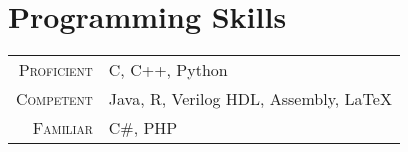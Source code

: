 
\section{Programming Skills}

\begin{tabular}{r|p{15.8cm}}
\textsc{Proficient} & C, C++, Python\\
\textsc{Competent} & Java, R, Verilog HDL, Assembly, \LaTeX \\
\textsc{Familiar} & C\#, PHP
\end{tabular}

